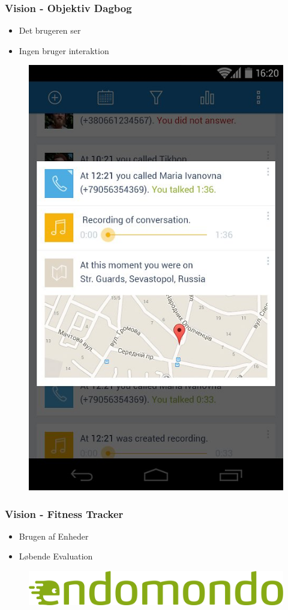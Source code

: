 \begin{frame}
\frametitle{Vision - Objektiv Dagbog}
\begin{itemize}
	\item Det brugeren ser
	\item Ingen bruger interaktion
\end{itemize}
\begin{figure}
	\includegraphics[scale=0.2]{graphics/diary}
\end{figure}
\end{frame}

\begin{frame}
\frametitle{Vision - Fitness Tracker}
\begin{itemize}
	\item Brugen af Enheder
	\item Løbende Evaluation
\end{itemize}
\begin{figure}
	\includegraphics[scale=0.4]{graphics/fitnesstracker}
\end{figure}
\end{frame}
